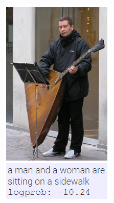 \begin{figure}
\begin{subfigure}{.5\textwidth}
			\includegraphics[width=.8\linewidth]{Images/Results/Bad/sitting_sidewalk}
			\label{fig:badresults5}
		\end{subfigure}%
		\begin{subfigure}{.5\textwidth}
			\centering

\end{subfigure}
\end{figure}
